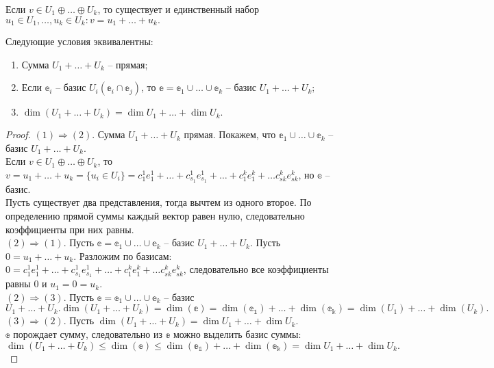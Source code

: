 \begin{Task}
	Если $v \in U_1 \oplus \ldots \oplus U_k$, то существует и единственный набор $u_1 \in U_1, \ldots, u_k \in U_k: v = u_1 + \ldots + u_k.$
\end{Task}
\begin{Theorem}
	Следующие условия эквивалентны:
	\begin{enumerate}
		\item Сумма $U_1 + \ldots + U_k$ -- прямая;
		\item Если $\mathbb{e}_i$ -- базис $U_i (\mathbb{e}_i \cap \mathbb{e}_j)$, то $\mathbb{e} = \mathbb{e}_1 \cup \ldots \cup \mathbb{e}_k$ -- базис $U_1 + \ldots + U_k;$
		\item $\dim(U_1 + \ldots + U_k) = \dim{U_1} + \ldots + \dim{U_k}.$
	\end{enumerate}
\end{Theorem}
\begin{proof}
	$(1) \Rightarrow (2).$ Сумма $U_1 + \ldots + U_k$ прямая. Покажем, что $\mathbb{e}_1 \cup \ldots \cup \mathbb{e}_k$ -- базис $U_1 + \ldots + U_k.$
	\\ Если $v \in U_1 \oplus \ldots \oplus U_k$, то  $v = u_1 + \ldots + u_k = \{ u_i \in U_i\} = c^1_1e^1_1 + \ldots + c^1_{s_1}e^1_{s_1} + \ldots + c^k_1e^k_1 + \ldots c^k_{sk}e^k_{sk}$, но $\mathbb{e}$ -- базис.
	\\ Пусть существует два представления, тогда вычтем из одного второе. По определению прямой суммы каждый вектор равен нулю, следовательно коэффициенты при них равны.
	\\ $(2) \Rightarrow (1).$ Пусть $\mathbb{e} = \mathbb{e}_1 \cup \ldots \cup \mathbb{e}_k$ -- базис $U_1 + \ldots + U_k$. Пусть $0 = u_1 + \ldots + u_k$. Разложим по базисам:
	\\ $0 = c^1_1e^1_1 + \ldots + c^1_{s_1}e^1_{s_1} + \ldots + c^k_1e^k_1 + \ldots c^k_{sk}e^k_{sk}$, следовательно все коэффициенты равны $0$ и $u_1 = 0 = u_k.$
	\\ $(2) \Rightarrow (3).$ Пусть $\mathbb{e} = \mathbb{e}_1 \cup \ldots \cup \mathbb{e}_k$ -- базис $U_1 + \ldots + U_k. \dim(U_1 + \ldots + U_k)  = \dim(\mathbb{e}) = \dim(\mathbb{e_1})+ \ldots + \dim(\mathbb{e_k}) = \dim(U_1) + \ldots + \dim(U_k).$
	\\ $(3) \Rightarrow (2).$ Пусть $\dim(U_1 + \ldots + U_k) = \dim{U_1} + \ldots + \dim{U_k}.$
	\\ $\mathbb{e}$ порождает сумму, следовательно из $\mathbb{e}$ можно выделить базис суммы:
	\\ $\dim(U_1 + \ldots + U_k) \leqslant \dim(\mathbb{e}) \leqslant \dim(\mathbb{e_1})+ \ldots + \dim(\mathbb{e_k}) = \dim{U_1} + \ldots + \dim{U_k}.$
 \end{proof}


